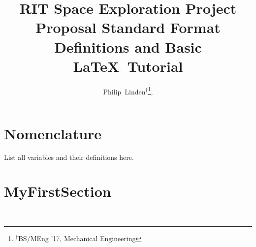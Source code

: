 \documentclass[journal]{SPEXformat}
\title{RIT Space Exploration Project Proposal Standard Format Definitions and Basic \LaTeX\ Tutorial}
\author{
  Philip~Linden$^{\dagger}$\thanks{$^{\dagger}$BS/MEng '17, Mechanical Engineering},
}
\begin{document}
\maketitle

\begin{abstract}
\blindtext[1]
\end{abstract}

\section{Nomenclature}
\label{sec:nomenclature}
List all variables and their definitions here.

\section{MyFirstSection}
\label{sec:section1}
\blindtext\
\end{document}
